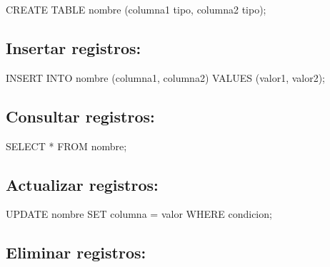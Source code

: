 \documentclass[
  a4paper,
  DIV=11,
  numbers=noendperiod,
  onepage,
  openany]{scrreprt}
\newenvironment{Shaded}{\begin{snugshade}}{\end{snugshade}}
\newcommand{\KeywordTok}[1]{\textcolor[rgb]{0.00,0.23,0.31}{#1}}
\newcommand{\NormalTok}[1]{\textcolor[rgb]{0.00,0.23,0.31}{#1}}
\newcommand{\OperatorTok}[1]{\textcolor[rgb]{0.37,0.37,0.37}{#1}}
\begin{document}
\begin{Shaded}
\begin{Highlighting}[]
\KeywordTok{CREATE} \KeywordTok{TABLE}\NormalTok{ nombre (columna1 tipo, columna2 tipo);}
\end{Highlighting}
\end{Shaded}

\hypertarget{insertar-registros-4}{%
\subsection{Insertar registros:}\label{insertar-registros-4}}

\begin{Shaded}
\begin{Highlighting}[]
\KeywordTok{INSERT} \KeywordTok{INTO}\NormalTok{ nombre (columna1, columna2) }\KeywordTok{VALUES}\NormalTok{ (valor1, valor2);}
\end{Highlighting}
\end{Shaded}

\hypertarget{consultar-registros-4}{%
\subsection{Consultar registros:}\label{consultar-registros-4}}

\begin{Shaded}
\begin{Highlighting}[]
\KeywordTok{SELECT} \OperatorTok{*} \KeywordTok{FROM}\NormalTok{ nombre;}
\end{Highlighting}
\end{Shaded}

\hypertarget{actualizar-registros-4}{%
\subsection{Actualizar registros:}\label{actualizar-registros-4}}

\begin{Shaded}
\begin{Highlighting}[]
\KeywordTok{UPDATE}\NormalTok{ nombre }\KeywordTok{SET}\NormalTok{ columna }\OperatorTok{=}\NormalTok{ valor }\KeywordTok{WHERE}\NormalTok{ condicion;}
\end{Highlighting}
\end{Shaded}

\hypertarget{eliminar-registros-4}{%
\subsection{Eliminar registros:}\label{eliminar-registros-4}}
\end{document}
